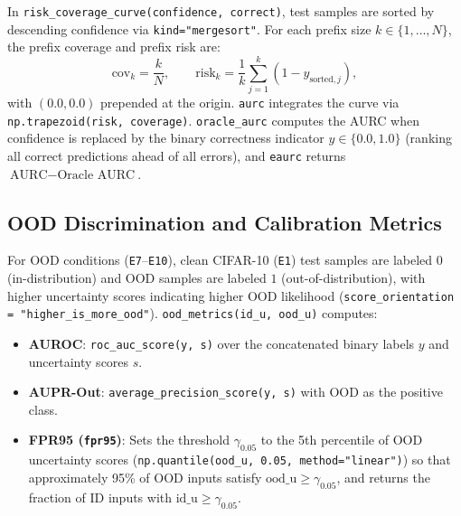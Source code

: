 \documentclass[11pt,a4paper]{article}
\begin{document}
In \texttt{risk\_\allowbreak{}coverage\_\allowbreak{}curve(\allowbreak{}confidence,\allowbreak{} correct)}, test samples are sorted by descending confidence via \texttt{kind="mergesort"}. For each prefix size $k \in \{1, \dots, N\}$, the prefix coverage and prefix risk are:
\begin{equation}
  \text{cov}_k = \frac{k}{N}, \qquad \text{risk}_k = \frac{1}{k} \sum_{j=1}^{k} \left(1 - y_{\text{sorted},j}\right),
\end{equation}
with $(0.0, 0.0)$ prepended at the origin. \texttt{aurc} integrates the curve via \texttt{np.\allowbreak{}trapezoid(\allowbreak{}risk,\allowbreak{} coverage)}. \texttt{oracle\_\allowbreak{}aurc} computes the AURC when confidence is replaced by the binary correctness indicator $y \in \{0.0, 1.0\}$ (ranking all correct predictions ahead of all errors), and \texttt{eaurc} returns $\text{AURC} - \text{Oracle AURC}$.

\subsection{OOD Discrimination and Calibration Metrics}

For OOD conditions (\texttt{E7}--\texttt{E10}), clean CIFAR-10 (\texttt{E1}) test samples are labeled $0$ (in-distribution) and OOD samples are labeled $1$ (out-of-distribution), with higher uncertainty scores indicating higher OOD likelihood (\texttt{score\_\allowbreak{}orientation = "higher\_\allowbreak{}is\_\allowbreak{}more\_\allowbreak{}ood"}). \texttt{ood\_\allowbreak{}metrics(\allowbreak{}id\_\allowbreak{}u,\allowbreak{} ood\_\allowbreak{}u)} computes:
\begin{itemize}
  \item \textbf{AUROC}: \texttt{roc\_\allowbreak{}auc\_\allowbreak{}score(\allowbreak{}y,\allowbreak{} s)} over the concatenated binary labels $y$ and uncertainty scores $s$.
  \item \textbf{AUPR-Out}: \texttt{average\_\allowbreak{}precision\_\allowbreak{}score(\allowbreak{}y,\allowbreak{} s)} with OOD as the positive class.
  \item \textbf{FPR95 (\texttt{fpr95})}: Sets the threshold $\gamma_{0.05}$ to the 5th percentile of OOD uncertainty scores (\texttt{np.\allowbreak{}quantile(\allowbreak{}ood\_\allowbreak{}u,\allowbreak{} 0.\allowbreak{}05,\allowbreak{} method="linear")}) so that approximately 95\% of OOD inputs satisfy $\text{ood\_u} \ge \gamma_{0.05}$, and returns the fraction of ID inputs with $\text{id\_u} \ge \gamma_{0.05}$.
\end{itemize}
\end{document}
